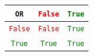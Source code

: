 \documentclass[border=10pt]{standalone}
\newcommand{\firatt}[1]{\texttt{#1}}
\newcommand{\firatrue}{\textcolor{green}{\firatt{True}}}
\newcommand{\firafalse}{\textcolor{red}{\firatt{False}}}
\begin{document}
\begin{tabular}{c|cc}
\firatt{OR} & \firafalse & \firatrue \\
\hline
\firafalse & \firafalse & \firatrue \\
\firatrue & \firatrue & \firatrue \\
\end{tabular}
\end{document}

